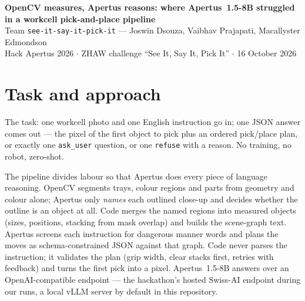 \documentclass[11pt,a4paper]{article}
\newcommand{\code}[1]{\texttt{#1}}
\begin{document}
\begin{center}
{\large\bfseries OpenCV measures, Apertus reasons: where Apertus~1.5-8B struggled in a workcell pick-and-place pipeline}\\[3pt]
{\small Team \code{see-it-say-it-pick-it} --- Joswin Dsouza, Vaibhav Prajapati, Macallyster Edmondson\\
Hack Apertus 2026 $\cdot$ ZHAW challenge ``See It, Say It, Pick It'' $\cdot$ 16 October 2026}
\end{center}

\section{Task and approach}
The task: one workcell photo and one English instruction go in; one JSON answer comes out ---
the pixel of the first object to pick plus an ordered pick/place plan, or exactly one
\code{ask\_user} question, or one \code{refuse} with a reason. No training, no robot, zero-shot.

The pipeline divides labour so that Apertus does every piece of language reasoning. OpenCV
segments trays, colour regions and parts from geometry and colour alone; Apertus only
\emph{names} each outlined close-up and decides whether the outline is an object at all.
Code merges the named regions into measured objects (sizes, positions, stacking from mask
overlap) and builds the scene-graph text. Apertus screens each instruction for dangerous
manner words and plans the moves as schema-constrained JSON against that graph. Code never
parses the instruction; it validates the plan (grip width, clear stacks first, retries with
feedback) and turns the first pick into a pixel. Apertus~1.5-8B answers over an
OpenAI-compatible endpoint --- the hackathon's hosted Swiss-AI endpoint during our runs, a
local vLLM server by default in this repository.
\end{document}
